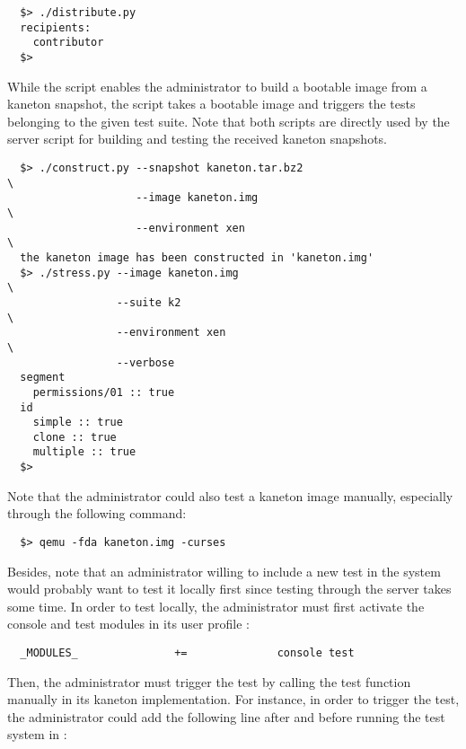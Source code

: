 \begin{verbatim}
  $> ./distribute.py
  recipients:
    contributor
  $>
\end{verbatim}

While the  script enables the administrator to build a
bootable image from a kaneton snapshot, the  script takes
a bootable image and triggers the tests belonging to the given test
suite. Note that both scripts are directly used by the server script for
building and testing the received kaneton snapshots.

\begin{verbatim}
  $> ./construct.py --snapshot kaneton.tar.bz2                          \
                    --image kaneton.img                                 \
                    --environment xen                                   \
  the kaneton image has been constructed in 'kaneton.img'
  $> ./stress.py --image kaneton.img                                    \
                 --suite k2                                             \
                 --environment xen                                      \
                 --verbose
  segment
    permissions/01 :: true
  id
    simple :: true
    clone :: true
    multiple :: true
  $> 
\end{verbatim}

Note that the administrator could also test a kaneton image manually,
especially through the following command:

\begin{verbatim}
  $> qemu -fda kaneton.img -curses
\end{verbatim}

Besides, note that an administrator willing to include a new test in the
system would probably want to test it locally first since testing through
the server takes some time. In order to test locally, the administrator
must first activate the console and test modules in its user profile
:

\begin{verbatim}
  _MODULES_               +=              console test
\end{verbatim}

Then, the administrator must trigger the test by calling the test function
manually in its kaneton implementation. For instance, in order to trigger
the  test, the administrator could add the
following line after \code{kernel\_initialize()} and before running the
test system in :

